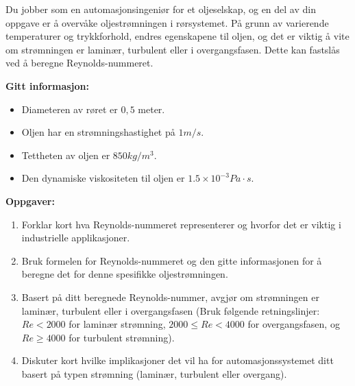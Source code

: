 


Du jobber som en automasjonsingeniør for et oljeselskap, og en del av din oppgave er å overvåke oljestrømningen i rørsystemet. På grunn av varierende temperaturer og trykkforhold, endres egenskapene til oljen, og det er viktig å vite om strømningen er laminær, turbulent eller i overgangsfasen. Dette kan fastslås ved å beregne Reynolds-nummeret.

\textbf{Gitt informasjon:}
\begin{itemize}
    \item Diameteren av røret er \(0,5\) meter.
    \item Oljen har en strømningshastighet på \(1 m/s\).
    \item Tettheten av oljen er \(850 kg/m^3\).
    \item Den dynamiske viskositeten til oljen er \(1.5 \times 10^{-3}  Pa \cdot s\).
\end{itemize}

\textbf{Oppgaver:}
\begin{enumerate}
    \item Forklar kort hva Reynolds-nummeret representerer og hvorfor det er viktig i industrielle applikasjoner.
    \item Bruk formelen for Reynolds-nummeret og den gitte informasjonen for å beregne det for denne spesifikke oljestrømningen.
    \item Basert på ditt beregnede Reynolds-nummer, avgjør om strømningen er laminær, turbulent eller i overgangsfasen (Bruk følgende retningslinjer: \(Re < 2000\) for laminær strømning, \(2000 \leq Re < 4000\) for overgangsfasen, og \(Re \geq 4000\) for turbulent strømning).
    \item Diskuter kort hvilke implikasjoner det vil ha for automasjonssystemet ditt basert på typen strømning (laminær, turbulent eller overgang).
\end{enumerate}



















